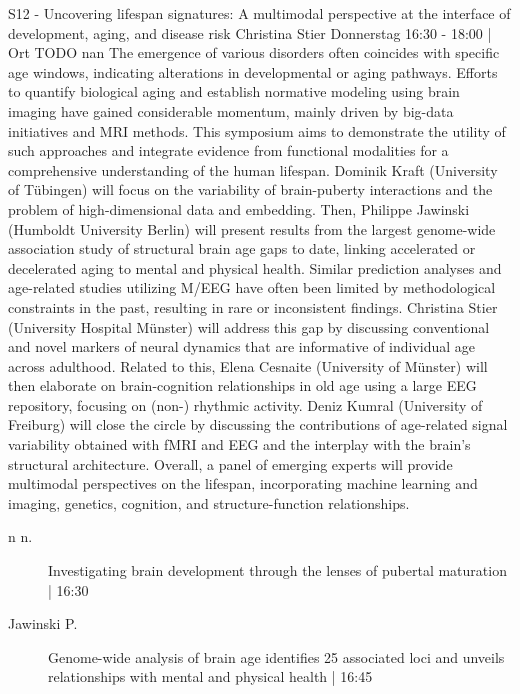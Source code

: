 
            \begin{symposium}
            {S12 - Uncovering lifespan signatures: A multimodal perspective at the interface of development, aging, and disease risk }
            {Christina Stier}
            {Donnerstag 16:30 - 18:00 | Ort TODO}
            {nan}
            The emergence of various disorders often coincides with specific age windows, indicating alterations in developmental or aging pathways. Efforts to quantify biological aging and establish normative modeling using brain imaging have gained considerable momentum, mainly driven by big-data initiatives and MRI methods. This symposium aims to demonstrate the utility of such approaches and integrate evidence from functional modalities for a comprehensive understanding of the human lifespan.
Dominik Kraft (University of Tübingen) will focus on the variability of brain-puberty interactions and the problem of high-dimensional data and embedding. Then, Philippe Jawinski (Humboldt University Berlin) will present results from the largest genome-wide association study of structural brain age gaps to date, linking accelerated or decelerated aging to mental and physical health. Similar prediction analyses and age-related studies utilizing M/EEG have often been limited by methodological constraints in the past, resulting in rare or inconsistent findings. Christina Stier (University Hospital Münster) will address this gap by discussing conventional and novel markers of neural dynamics that are informative of individual age across adulthood. Related to this, Elena Cesnaite (University of Münster) will then elaborate on brain-cognition relationships in old age using a large EEG repository, focusing on (non-) rhythmic activity. Deniz Kumral (University of Freiburg) will close the circle by discussing the contributions of age-related signal variability obtained with fMRI and EEG and the interplay with the brain’s structural architecture.
Overall, a panel of emerging experts will provide multimodal perspectives on the lifespan, incorporating machine learning and imaging, genetics, cognition, and structure-function relationships.
            \begin{description}    
            
                \item [n n.] Investigating brain development through the lenses of pubertal maturation \textcolor{mygray}{ | 16:30}    
                
                \item [ Jawinski P.] Genome-wide analysis of brain age identifies 25 associated loci and unveils relationships with mental and physical health \textcolor{mygray}{ | 16:45}    
                

\end{description}
\end{symposium}
